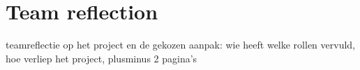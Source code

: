 \section{Team reflection}
teamreflectie op het project en de gekozen aanpak: wie heeft welke rollen vervuld, hoe verliep het project, plusminus 2 pagina's

